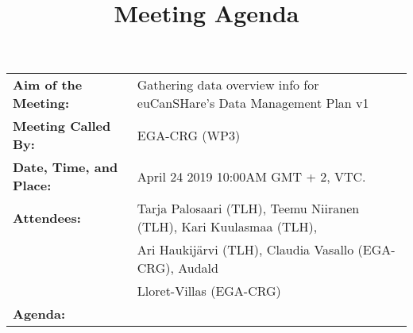 \documentclass{article}
\begin{document}




\title{Meeting Agenda}
\date{}

%
%


\begin{table}[h]
  \begin{tabular}{ll}
\textbf{Aim of the Meeting:} & Gathering data overview info for euCanSHare's Data Management Plan v1 \\  [5pt]  
\textbf{Meeting Called By:}  &EGA-CRG (WP3)\\[ 5pt]
  \textbf{Date, Time, and Place:}  & April  24 2019 10:00AM GMT + 2, VTC. \\ [5pt]
  \textbf{Attendees:}  & Tarja Palosaari (TLH), Teemu Niiranen (TLH), Kari Kuulasmaa (TLH), \\ 
 & Ari Haukij{\"a}rvi (TLH), Claudia Vasallo (EGA-CRG), Audald \\
 &  Lloret-Villas (EGA-CRG) \\ [50pt]    
\textbf{Agenda:}  &   \\ 
\end{tabular}
\end{table}
%
%
\end{document}
